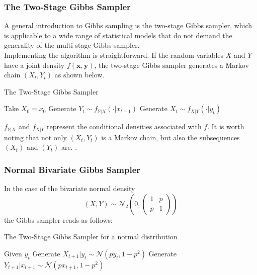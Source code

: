 \subsubsection{The Two-Stage Gibbs Sampler}
A general introduction to Gibbs sampling is the two-stage Gibbs sampler, which is applicable to a wide range of statistical models that do not demand the generality of the multi-stage Gibbs sampler. \\
Implementing the algorithm is straightforward. If the random variables $X$ and $Y$ have a joint density $f\left(\pmb{x},\pmb{y}\right)$, the two-stage Gibbs sampler generates a Markov chain $\left(X_t,Y_t\right)$ as shown below.
\begin{algorithm}
\caption{The Two-Stage Gibbs Sampler}
\begin{algorithmic}[1]
\Statex Take $X_0=x_0$
    \State Generate $Y_t\sim f_{Y|X}\left(\cdot|x_{t-1}\right)$
    \State Generate $X_t\sim f_{X|Y}\left(\cdot|y_t\right)$
    \EndFor
\end{algorithmic}
\end{algorithm} 
$f_{Y|X}$ and $f_{X|Y}$ represent the conditional densities associated with $f$. It is worth noting that not only $\left(X_t,Y_t\right)$ is a Markov chain, but also the subsequences $\left(X_t\right)$ and $\left(Y_t\right)$ are. \autocite[][339]{robert2013monte}.
\subsubsection*{Normal Bivariate Gibbs Sampler} 
In the case of the bivariate normal density
\begin{equation*}
    \left(X,Y\right)\sim \mathcal{N}_2\left(0,  \begin{pmatrix}
    1 & p \\ p & 1
    \end{pmatrix}\right)
\end{equation*}
the Gibbs sampler reads as follows:
\begin{algorithm}
\caption{The Two-Stage Gibbs Sampler for a normal distribution}
\begin{algorithmic}[1]
\Statex Given $y_t$
    \State Generate $X_{t+1}|y_t \sim \mathcal{N}\left(py_t, 1-p^2\right)$
    \State Generate $Y_{t+1}|x_{t+1}\sim\mathcal{N}\left(px_{t+1},1-p^2\right)$
    \EndFor
\end{algorithmic}
\end{algorithm} \\
\autocite[][340]{robert2013monte}
